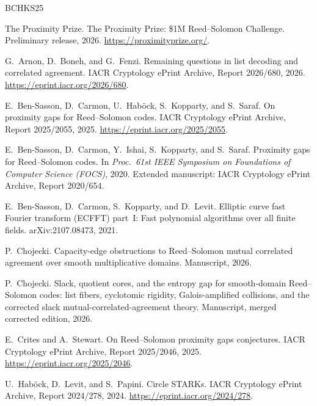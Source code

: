 \documentclass[11pt]{article}
\theoremstyle{definition}
\theoremstyle{remark}
\begin{document}
\begin{thebibliography}{BCHKS25}

The Proximity Prize.
\newblock The Proximity Prize: \$1M Reed--Solomon Challenge.
\newblock Preliminary release, 2026.
\newblock \url{https://proximityprize.org/}.


G.~Arnon, D.~Boneh, and G.~Fenzi.
\newblock Remaining questions in list decoding and correlated agreement.
\newblock IACR Cryptology ePrint Archive, Report 2026/680, 2026.
\newblock \url{https://eprint.iacr.org/2026/680}.

E.~Ben-Sasson, D.~Carmon, U.~Hab{\"o}ck, S.~Kopparty, and S.~Saraf.
\newblock On proximity gaps for Reed--Solomon codes.
\newblock IACR Cryptology ePrint Archive, Report 2025/2055, 2025.
\newblock \url{https://eprint.iacr.org/2025/2055}.


E.~Ben-Sasson, D.~Carmon, Y.~Ishai, S.~Kopparty, and S.~Saraf.
\newblock Proximity gaps for Reed--Solomon codes.
\newblock In \emph{Proc.\ 61st IEEE Symposium on Foundations of Computer Science (FOCS)}, 2020.
\newblock Extended manuscript: IACR Cryptology ePrint Archive, Report 2020/654.

E.~Ben-Sasson, D.~Carmon, S.~Kopparty, and D.~Levit.
\newblock Elliptic curve fast Fourier transform (ECFFT) part~I: Fast polynomial algorithms over all finite fields.
\newblock arXiv:2107.08473, 2021.

P.~Chojecki.
\newblock Capacity-edge obstructions to Reed--Solomon mutual correlated agreement over smooth multiplicative domains.
\newblock Manuscript, 2026.

P.~Chojecki.
\newblock Slack, quotient cores, and the entropy gap for smooth-domain Reed--Solomon codes: list fibers, cyclotomic rigidity, Galois-amplified collisions, and the corrected slack mutual-correlated-agreement theory.
\newblock Manuscript, merged corrected edition, 2026.

E.~Crites and A.~Stewart.
\newblock On Reed--Solomon proximity gaps conjectures.
\newblock IACR Cryptology ePrint Archive, Report 2025/2046, 2025.
\newblock \url{https://eprint.iacr.org/2025/2046}.

U.~Hab{\"o}ck, D.~Levit, and S.~Papini.
\newblock Circle STARKs.
\newblock IACR Cryptology ePrint Archive, Report 2024/278, 2024.
\newblock \url{https://eprint.iacr.org/2024/278}.

\end{thebibliography}
\end{document}
